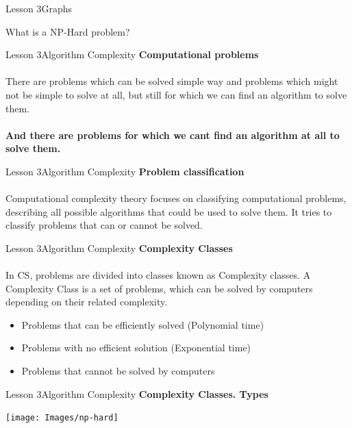 \documentclass[aspectratio=1610]{beamer}
\begin{document}
\begin{frame}{Lesson 3}{Graphs}
\Huge
\begin{center}
What is a NP-Hard problem?
\end{center}
\end{frame}


\begin{frame}{Lesson 3}{Algorithm Complexity}
\LARGE
\textbf{Computational problems}\\~\\
There are problems which can be solved simple way and problems which 
might not be simple to solve at all, but still for which we can find an 
algorithm to solve them.\\~\\
\textbf{And there are problems for which we cant find an algorithm at all to
solve them.}
\end{frame}



\begin{frame}{Lesson 3}{Algorithm Complexity}
\LARGE
\textbf{Problem classification}\\~\\
Computational complexity theory focuses on classifying computational problems, 
describing all possible algorithms that could be used to solve them. It tries to
classify problems that can or cannot be solved.
\end{frame}
 
 

\begin{frame}{Lesson 3}{Algorithm Complexity}
\LARGE
\textbf{Complexity Classes}\\~\\
In CS, problems are divided into classes known as Complexity
classes. A Complexity Class is a set of problems, which can be solved 
by computers depending on their related complexity.
\Large
\begin{itemize}
	\item Problems that can be efficiently solved (Polynomial time)
	\item Problems with no efficient solution (Exponential time)
	\item Problems that cannot be solved by computers
\end{itemize}
\end{frame}


\begin{frame}{Lesson 3}{Algorithm Complexity}
\LARGE
\textbf{Complexity Classes. Types}\\
\begin{center}
\texttt{[image: Images/np-hard]}
\end{center}
\end{frame}
\end{document}

